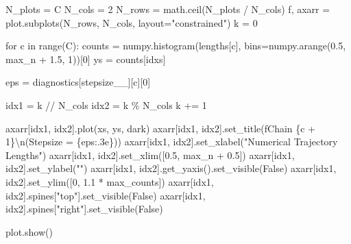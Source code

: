\documentclass[
  letterpaper,
  DIV=11,
  numbers=noendperiod]{scrartcl}
\newenvironment{Shaded}{\begin{snugshade}}{\end{snugshade}}
\newcommand{\BuiltInTok}[1]{\textcolor[rgb]{0.00,0.23,0.31}{#1}}
\newcommand{\CharTok}[1]{\textcolor[rgb]{0.13,0.47,0.30}{#1}}
\newcommand{\ControlFlowTok}[1]{\textcolor[rgb]{0.00,0.23,0.31}{#1}}
\newcommand{\DecValTok}[1]{\textcolor[rgb]{0.68,0.00,0.00}{#1}}
\newcommand{\FloatTok}[1]{\textcolor[rgb]{0.68,0.00,0.00}{#1}}
\newcommand{\KeywordTok}[1]{\textcolor[rgb]{0.00,0.23,0.31}{#1}}
\newcommand{\NormalTok}[1]{\textcolor[rgb]{0.00,0.23,0.31}{#1}}
\newcommand{\OperatorTok}[1]{\textcolor[rgb]{0.37,0.37,0.37}{#1}}
\newcommand{\SpecialCharTok}[1]{\textcolor[rgb]{0.37,0.37,0.37}{#1}}
\newcommand{\SpecialStringTok}[1]{\textcolor[rgb]{0.13,0.47,0.30}{#1}}
\newcommand{\StringTok}[1]{\textcolor[rgb]{0.13,0.47,0.30}{#1}}
\newcommand{\VariableTok}[1]{\textcolor[rgb]{0.07,0.07,0.07}{#1}}
\begin{document}
\begin{Shaded}
\begin{Highlighting}[]
\NormalTok{  N\_plots }\OperatorTok{=}\NormalTok{ C}
\NormalTok{  N\_cols }\OperatorTok{=} \DecValTok{2}
\NormalTok{  N\_rows }\OperatorTok{=}\NormalTok{ math.ceil(N\_plots }\OperatorTok{/}\NormalTok{ N\_cols)}
\NormalTok{  f, axarr }\OperatorTok{=}\NormalTok{ plot.subplots(N\_rows, N\_cols, layout}\OperatorTok{=}\StringTok{"constrained"}\NormalTok{)}
\NormalTok{  k }\OperatorTok{=} \DecValTok{0}
  
  \ControlFlowTok{for}\NormalTok{ c }\KeywordTok{in} \BuiltInTok{range}\NormalTok{(C):}
\NormalTok{    counts }\OperatorTok{=}\NormalTok{ numpy.histogram(lengths[c], }
\NormalTok{                             bins}\OperatorTok{=}\NormalTok{numpy.arange(}\FloatTok{0.5}\NormalTok{, max\_n }\OperatorTok{+} \FloatTok{1.5}\NormalTok{, }\DecValTok{1}\NormalTok{))[}\DecValTok{0}\NormalTok{]}
\NormalTok{    ys }\OperatorTok{=}\NormalTok{ counts[idxs]}
    
\NormalTok{    eps }\OperatorTok{=}\NormalTok{ diagnostics[}\StringTok{\textquotesingle{}stepsize\_\_\textquotesingle{}}\NormalTok{][c][}\DecValTok{0}\NormalTok{]}
    
\NormalTok{    idx1 }\OperatorTok{=}\NormalTok{ k }\OperatorTok{//}\NormalTok{ N\_cols}
\NormalTok{    idx2 }\OperatorTok{=}\NormalTok{ k }\OperatorTok{\%}\NormalTok{ N\_cols}
\NormalTok{    k }\OperatorTok{+=} \DecValTok{1}
    
\NormalTok{    axarr[idx1, idx2].plot(xs, ys, dark)}
\NormalTok{    axarr[idx1, idx2].set\_title(}\SpecialStringTok{f\textquotesingle{}Chain }\SpecialCharTok{\{}\NormalTok{c }\OperatorTok{+} \DecValTok{1}\SpecialCharTok{\}}\CharTok{\textbackslash{}n}\SpecialStringTok{(Stepsize = }\SpecialCharTok{\{}\NormalTok{eps}\SpecialCharTok{:.3e\}}\SpecialStringTok{)\textquotesingle{}}\NormalTok{)}
\NormalTok{    axarr[idx1, idx2].set\_xlabel(}\StringTok{"Numerical Trajectory Lengths"}\NormalTok{)}
\NormalTok{    axarr[idx1, idx2].set\_xlim([}\FloatTok{0.5}\NormalTok{, max\_n }\OperatorTok{+} \FloatTok{0.5}\NormalTok{])}
\NormalTok{    axarr[idx1, idx2].set\_ylabel(}\StringTok{""}\NormalTok{)}
\NormalTok{    axarr[idx1, idx2].get\_yaxis().set\_visible(}\VariableTok{False}\NormalTok{)}
\NormalTok{    axarr[idx1, idx2].set\_ylim([}\DecValTok{0}\NormalTok{, }\FloatTok{1.1} \OperatorTok{*}\NormalTok{ max\_counts])}
\NormalTok{    axarr[idx1, idx2].spines[}\StringTok{"top"}\NormalTok{].set\_visible(}\VariableTok{False}\NormalTok{)}
\NormalTok{    axarr[idx1, idx2].spines[}\StringTok{"right"}\NormalTok{].set\_visible(}\VariableTok{False}\NormalTok{)}
  
\NormalTok{  plot.show()}
\end{Highlighting}
\end{Shaded}
\end{document}
